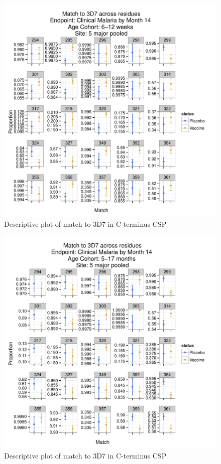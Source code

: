\documentclass[]{article}
\begin{document}
\begin{figure}[htbp]
\centering
\includegraphics{figures/residue-specific-match-newborn-c-1.pdf}
\caption{Descriptive plot of match to 3D7 in C-terminus CSP}
\end{figure}

\begin{figure}[htbp]
\centering
\includegraphics{figures/residue-specific-match-infant-c-1.pdf}
\caption{Descriptive plot of match to 3D7 in C-terminus CSP}
\end{figure}
\end{document}
